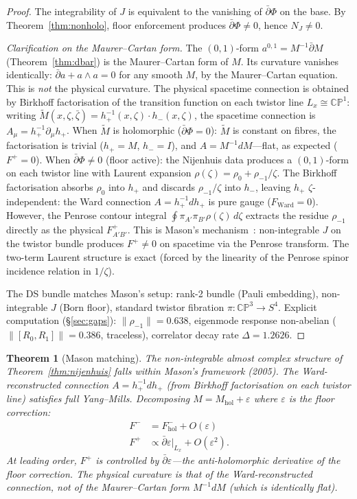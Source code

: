 \documentclass[11pt,a4paper]{article}
\newtheorem{theorem}{Theorem}[section]
\theoremstyle{definition}
\theoremstyle{remark}
\newcommand{\CP}{\mathbb{CP}}
\newcommand{\dbar}{\bar{\partial}}
\begin{document}
\begin{proof}
The integrability of $J$ is equivalent to the vanishing of $\dbar\Phi$ on the base. By Theorem~\ref{thm:nonholo}, floor enforcement produces $\dbar\Phi\neq 0$, hence $N_J\neq 0$.

\emph{Clarification on the Maurer--Cartan form.} The $(0,1)$-form $a^{0,1}=M^{-1}\dbar M$ (Theorem~\ref{thm:dbar}) is the Maurer--Cartan form of $M$. Its curvature vanishes identically: $\dbar a+a\wedge a=0$ for any smooth $M$, by the Maurer--Cartan equation. This is \emph{not} the physical curvature. The physical spacetime connection is obtained by Birkhoff factorisation of the transition function on each twistor line $L_x\cong\CP^1$: writing $\tilde{M}(x,\zeta,\bar\zeta)=h_+^{-1}(x,\zeta)\cdot h_-(x,\zeta)$, the spacetime connection is $A_\mu=h_+^{-1}\partial_\mu h_+$. When $\tilde{M}$ is holomorphic ($\dbar\Phi=0$): $\tilde{M}$ is constant on fibres, the factorisation is trivial ($h_+=M$, $h_-=I$), and $A=M^{-1}dM$---flat, as expected ($F^+=0$). When $\dbar\Phi\neq 0$ (floor active): the Nijenhuis data produces a $(0,1)$-form on each twistor line with Laurent expansion $\rho(\zeta)=\rho_0+\rho_{-1}/\zeta$. The Birkhoff factorisation absorbs $\rho_0$ into $h_+$ and discards $\rho_{-1}/\zeta$ into $h_-$, leaving $h_+$ $\zeta$-independent: the Ward connection $A=h_+^{-1}dh_+$ is pure gauge ($F_{\mathrm{Ward}}=0$). However, the Penrose contour integral $\oint\pi_{A'}\pi_{B'}\rho(\zeta)\,d\zeta$ extracts the residue $\rho_{-1}$ directly as the physical $F^+_{A'B'}$. This is Mason's mechanism~\cite{Mason2005}: non-integrable $J$ on the twistor bundle produces $F^+\neq 0$ on spacetime via the Penrose transform. The two-term Laurent structure is exact (forced by the linearity of the Penrose spinor incidence relation in $1/\zeta$).

The DS bundle matches Mason's setup: rank-2 bundle (Pauli embedding), non-integrable $J$ (Born floor), standard twistor fibration $\pi:\CP^3\to S^4$. Explicit computation (\S\ref{sec:gaps}): $\|\rho_{-1}\|=0.638$, eigenmode response non-abelian ($\|[R_0,R_1]\|=0.386$, traceless), correlator decay rate $\Delta=1.2626$.
\end{proof}

\begin{theorem}[Mason matching]\label{thm:mason}
The non-integrable almost complex structure of Theorem~\ref{thm:nijenhuis} falls within Mason's framework (2005). The Ward-reconstructed connection $A=h_+^{-1}dh_+$ (from Birkhoff factorisation on each twistor line) satisfies full Yang--Mills. Decomposing $M=M_{\mathrm{hol}}+\varepsilon$ where $\varepsilon$ is the floor correction:
\begin{align}
F^-&=F^-_{\mathrm{hol}}+O(\varepsilon) \\
F^+&\propto\dbar\varepsilon\big|_{L_x}+O(\varepsilon^2).
\end{align}
At leading order, $F^+$ is controlled by $\dbar\varepsilon$---the anti-holomorphic derivative of the floor correction. The physical curvature is that of the Ward-reconstructed connection, not of the Maurer--Cartan form $M^{-1}dM$ (which is identically flat).
\end{theorem}
\end{document}

